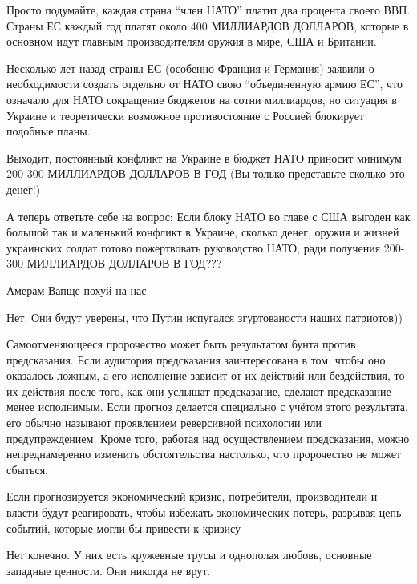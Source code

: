\begin{multicols}{2}

Просто подумайте, каждая страна \enquote{член НАТО} платит два процента своего ВВП.
Страны ЕС каждый год платят около 400 МИЛЛИАРДОВ ДОЛЛАРОВ, которые в основном
идут главным производителям оружия в мире, США и Британии.
 
Несколько лет назад страны ЕС (особенно Франция и Германия) заявили о
необходимости создать отдельно от НАТО свою \enquote{объединенную армию ЕС}, что
означало для НАТО сокращение бюджетов на сотни миллиардов, но ситуация в
Украине и теоретически возможное противостояние с Россией блокирует подобные
планы.
 
Выходит, постоянный конфликт на Украине в бюджет НАТО приносит минимум 200-300
МИЛЛИАРДОВ ДОЛЛАРОВ В ГОД (Вы только представьте сколько это денег!)
 
А теперь ответьте себе на вопрос: Если блоку НАТО во главе с США выгоден как
большой так и маленький конфликт в Украине, сколько денег, оружия и жизней
украинских солдат готово пожертвовать руководство НАТО, ради получения 200-300
МИЛЛИАРДОВ ДОЛЛАРОВ В ГОД???


Амерам Вапще похуй на нас


Нет. Они будут уверены, что Путин испугался згуртованости наших патриотов))


Самоотменяющееся пророчество может быть результатом бунта против предсказания.
Если аудитория предсказания заинтересована в том, чтобы оно оказалось ложным, а
его исполнение зависит от их действий или бездействия, то их действия после
того, как они услышат предсказание, сделают предсказание менее исполнимым. Если
прогноз делается специально с учётом этого результата, его обычно называют
проявлением реверсивной психологии или предупреждением. Кроме того, работая над
осуществлением предсказания, можно непреднамеренно изменить обстоятельства
настолько, что пророчество не может сбыться.

Если прогнозируется экономический кризис, потребители, производители и власти
будут реагировать, чтобы избежать экономических потерь, разрывая цепь событий,
которые могли бы привести к кризису


Нет конечно. У них есть кружевные трусы и однополая любовь, основные западные
ценности. Они никогда не врут.




\end{multicols}

